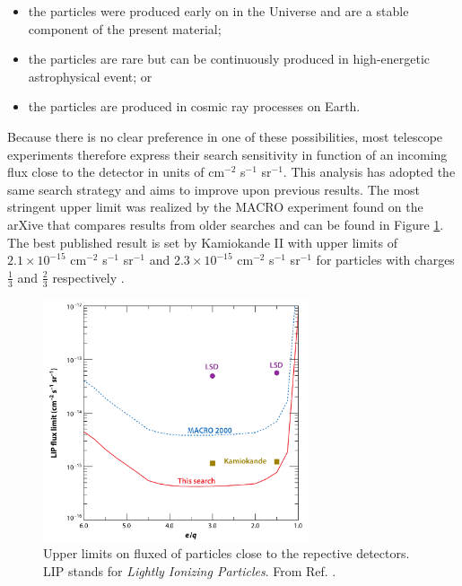 \begin{itemize}
\item the particles were produced early on in the Universe and are a stable component of the present material;
\item the particles are rare but can be continuously produced in high-energetic astrophysical event; or
\item the particles are produced in cosmic ray processes on Earth.
\end{itemize}
Because there is no clear preference in one of these possibilities, most telescope experiments therefore express their search sensitivity in function of an incoming flux close to the detector in units of cm$^{-2}$ s$^{-1}$ sr$^{-1}$. This analysis has adopted the same search strategy and aims to improve upon previous results. The most stringent upper limit was realized by the MACRO experiment found on the arXive that compares results from older searches and can be found in Figure \ref{fig:upperlimits}. The best published result is set by Kamiokande II with upper limits of $2.1 \times 10^{-15}$ cm$^{-2}$ s$^{-1}$ sr$^{-1}$ and $2.3 \times 10^{-15}$ cm$^{-2}$ s$^{-1}$ sr$^{-1}$ for particles with charges $\frac{1}{3}$ and $\frac{2}{3}$ respectively \cite{Mori:1990kw}.
\begin{figure}
\centering
\includegraphics[width=0.7\textwidth]{chapter2/img/upperlimits.png}
\caption{Upper limits on fluxed of particles close to the repective detectors. LIP stands for \textit{Lightly Ionizing Particles}. From Ref. \cite{Ambrosio:2004ub}.}
\label{fig:upperlimits}
\end{figure}


~\vfill

